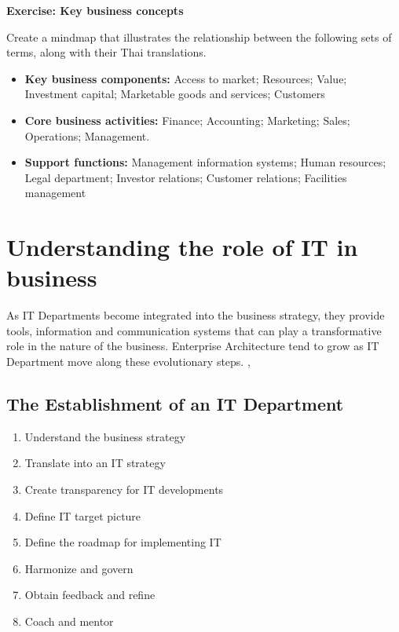 \documentclass[]{book}
\providecommand{\tightlist}{%
  \setlength{\itemsep}{0pt}\setlength{\parskip}{0pt}}
\let\BeginKnitrBlock\begin \let\EndKnitrBlock\end
\begin{document}
\BeginKnitrBlock{rmdexercise}
\textbf{Exercise: Key business concepts}

Create a mindmap that illustrates the relationship between the following sets of terms, along with their Thai translations.

\begin{itemize}
\tightlist
\item
  \textbf{Key business components:} Access to market; Resources; Value; Investment capital; Marketable goods and services; Customers
\item
  \textbf{Core business activities:} Finance; Accounting; Marketing; Sales; Operations; Management.
\item
  \textbf{Support functions:} Management information systems; Human resources; Legal department; Investor relations; Customer relations; Facilities management
\end{itemize}
\EndKnitrBlock{rmdexercise}

\hypertarget{understanding-the-role-of-it-in-business}{%
\section{Understanding the role of IT in business}\label{understanding-the-role-of-it-in-business}}

As IT Departments become integrated into the business strategy, they provide tools, information and communication systems that can play a transformative role in the nature of the business. Enterprise Architecture tend to grow as IT Department move along these evolutionary steps. \citep{Hohpe2017a}, \citep{Hohpe2017b}

\hypertarget{the-establishment-of-an-it-department}{%
\subsection{The Establishment of an IT Department}\label{the-establishment-of-an-it-department}}

\begin{enumerate}
\def\labelenumi{\arabic{enumi}.}
\tightlist
\item
  Understand the business strategy
\item
  Translate into an IT strategy
\item
  Create transparency for IT developments
\item
  Define IT target picture
\item
  Define the roadmap for implementing IT
\item
  Harmonize and govern
\item
  Obtain feedback and refine
\item
  Coach and mentor
\end{enumerate}
\end{document}
